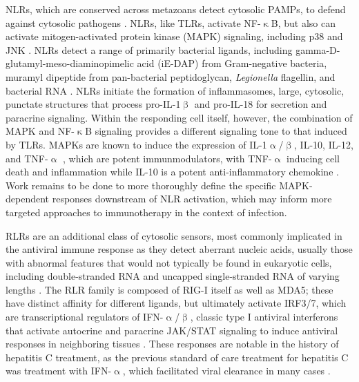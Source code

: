 NLRs, which are conserved across metazoans detect cytosolic PAMPs, to defend against cytosolic pathogens \citep{Creagh2006, Clarke2014, Motta2015, Martinon2005}. NLRs, like TLRs, activate NF\hyp{}$\upkappa$B, but also can activate mitogen\hyp{}activated protein kinase (MAPK) signaling, including p38 and JNK \citep{Shaw2008, Franchi2009, Saxena2014, Platnich2019, Zhong2013, Velloso2019}. NLRs detect a range of primarily bacterial ligands, including gamma\hyp{}D\hyp{}glutamyl\hyp{}meso\hyp{}diaminopimelic acid (iE\hyp{}DAP) from Gram\hyp{}negative bacteria, muramyl dipeptide from pan\hyp{}bacterial peptidoglycan, \textit{Legionella} flagellin, and bacterial RNA \citep{Saxena2014, Franchi2009, Zhong2013}. NLRs initiate the formation of inflammasomes, large, cytosolic, punctate structures that process pro\hyp{}IL\hyp{}1$\upbeta$ and pro\hyp{}IL\hyp{}18 for secretion and paracrine signaling. Within the responding cell itself, however, the combination of MAPK and NF\hyp{}$\upkappa$B signaling provides a different signaling tone to that induced by TLRs. MAPKs are known to induce the expression of IL\hyp{}1$\upalpha$/$\upbeta$, IL\hyp{}10, IL\hyp{}12, and TNF\hyp{}$\upalpha$ \citep{Dong2002, Arthur2013, SoaresSilva2016}, which are potent immunmodulators, with TNF\hyp{}$\upalpha$ inducing cell death and inflammation while IL\hyp{}10 is a potent anti\hyp{}inflammatory chemokine \citep{SoaresSilva2016, Couper2008}. Work remains to be done to more thoroughly define the specific MAPK\hyp{}dependent responses downstream of NLR activation, which may inform more targeted approaches to immunotherapy in the context of infection.

RLRs are an additional class of cytosolic sensors, most commonly implicated in the antiviral immune response as they detect aberrant nucleic acids, usually those with abnormal features that would not typically be found in eukaryotic cells, including double\hyp{}stranded RNA and uncapped single\hyp{}stranded RNA of varying lengths \citep{Loo2011, Jia2021, Rehwinkel2020, Kawai2010}. The RLR family is composed of RIG\hyp{}I itself as well as MDA5; these have distinct affinity for different ligands, but ultimately activate IRF3/7, which are transcriptional regulators of IFN\hyp{}$\upalpha$/$\upbeta$, classic type I antiviral interferons that activate autocrine and paracrine JAK/STAT signaling to induce antiviral responses in neighboring tissues \citep{Loo2011}. These responses are notable in the history of hepatitis C treatment, as the previous standard of care treatment for hepatitis C was treatment with IFN\hyp{}$\upalpha$, which facilitated viral clearance in many cases \citep{Rong2010}.

